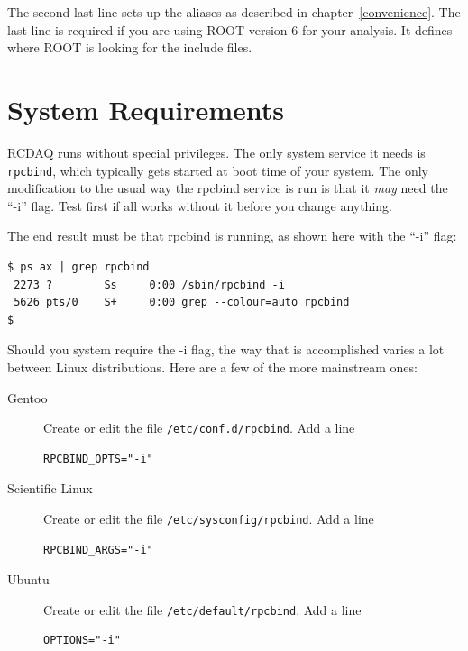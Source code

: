 \documentclass{article}[11pt]
\begin{document}
The second-last line sets up the aliases as described in
chapter~\ref{convenience}. The last line is required if you are using
ROOT version 6 for your analysis. It defines where ROOT is looking for
the include files.



\section{System Requirements}

RCDAQ runs without special privileges. The only system service it
needs is \verb|rpcbind|, which typically gets started at boot time of
your system. The only modification to the usual way the rpcbind
service is run is that it \emph{may} need the ``-i'' flag. Test first
if all works without it before you change anything.

The end result must be that rpcbind is running, as shown here with the
``-i'' flag:

\begin{verbatim} 
$ ps ax | grep rpcbind
 2273 ?        Ss     0:00 /sbin/rpcbind -i
 5626 pts/0    S+     0:00 grep --colour=auto rpcbind
$
\end{verbatim}

Should you system require the -i flag, the way that is accomplished varies
a lot between Linux distributions. Here are a few of the more
mainstream ones:

\begin{description}

\item[Gentoo]  Create or edit the file \verb|/etc/conf.d/rpcbind|. Add a line

\begin{verbatim} 
RPCBIND_OPTS="-i"  
\end{verbatim}

\item[Scientific Linux]  Create or edit the file \verb|/etc/sysconfig/rpcbind|. Add a line

\begin{verbatim} 
RPCBIND_ARGS="-i"  
\end{verbatim}

\item[Ubuntu]  Create or edit the file \verb|/etc/default/rpcbind|. Add a line

\begin{verbatim} 
OPTIONS="-i"  
\end{verbatim}

\end{description}
\end{document}
